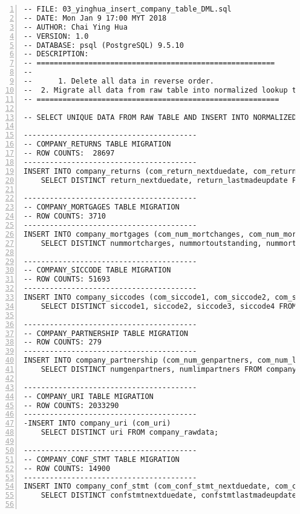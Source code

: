 \lstset{basicstyle=\ttfamily\tiny}  
\begin{lstlisting}[breaklines, frame=single, numbers=left, caption={PL/pgSQL's DML Script for Company Normalized Database Migration.}, label=commandline-02]
-- FILE: 03_yinghua_insert_company_table_DML.sql  
-- DATE: Mon Jan 9 17:00 MYT 2018
-- AUTHOR: Chai Ying Hua 
-- VERSION: 1.0
-- DATABASE: psql (PostgreSQL) 9.5.10
-- DESCRIPTION:
-- =======================================================
--
--    	1. Delete all data in reverse order.
--	2. Migrate all data from raw table into normalized lookup table. 
-- ========================================================

-- SELECT UNIQUE DATA FROM RAW TABLE AND INSERT INTO NORMALIZED TABLE. 

----------------------------------------
-- COMPANY_RETURNS TABLE MIGRATION 
-- ROW COUNTS:  28697
----------------------------------------
INSERT INTO company_returns (com_return_nextduedate, com_return_lastmadeupdate)
	SELECT DISTINCT return_nextduedate, return_lastmadeupdate FROM company_rawdata;

----------------------------------------
-- COMPANY_MORTGAGES TABLE MIGRATION 
-- ROW COUNTS: 3710
----------------------------------------
INSERT INTO company_mortgages (com_num_mortchanges, com_num_mortoutstanding, com_num_mortpartsatisfied, com_num_mortsatisfied)
	SELECT DISTINCT nummortcharges, nummortoutstanding, nummortpartsatisfied, nummortsatisfied FROM company_rawdata;

----------------------------------------
-- COMPANY_SICCODE TABLE MIGRATION 
-- ROW COUNTS: 51693
----------------------------------------
INSERT INTO company_siccodes (com_siccode1, com_siccode2, com_siccode3, com_siccode4)
	SELECT DISTINCT siccode1, siccode2, siccode3, siccode4 FROM company_rawdata;

----------------------------------------
-- COMPANY_PARTNERSHIP TABLE MIGRATION 
-- ROW COUNTS: 279
----------------------------------------
INSERT INTO company_partnership (com_num_genpartners, com_num_limpartners)
	SELECT DISTINCT numgenpartners, numlimpartners FROM company_rawdata;

----------------------------------------
-- COMPANY_URI TABLE MIGRATION 
-- ROW COUNTS: 2033290
----------------------------------------
-INSERT INTO company_uri (com_uri)
	SELECT DISTINCT uri FROM company_rawdata;

----------------------------------------
-- COMPANY_CONF_STMT TABLE MIGRATION 
-- ROW COUNTS: 14900
----------------------------------------
INSERT INTO company_conf_stmt (com_conf_stmt_nextduedate, com_conf_stmt_lastmadeupdate)
	SELECT DISTINCT confstmtnextduedate, confstmtlastmadeupdate FROM company_rawdata;


\end{lstlisting}
